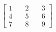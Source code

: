 \documentclass[preview]{standalone}
\begin{document}
\begin{align*}
\begin{bmatrix} 1 & \quad 2 & \quad 3 \\ 4 & \quad 5 & \quad 6 \\ 7 & \quad 8 & \quad 9 \end{bmatrix}
\end{align*}
\end{document}
